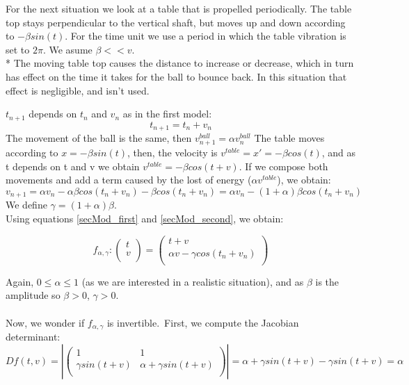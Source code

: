 \documentclass[a4paper]{article}
\begin{document}
For the next situation we look at a table that is propelled periodically.
The table top stays perpendicular to the vertical shaft,
but moves up and down according to $-\beta sin(t)$.
For the time unit we use a period in which the table vibration is set to $2\pi$.
We asume $\beta << v$.
\\*
The moving table top causes the distance to increase or decrease,
which in turn has effect on the time it takes for the ball to bounce back.
In this situation that effect is negligible, and isn't used.


$t_{n+1}$ depends on $t_n$ and $v_n$ as in the first model: 
\begin{equation}\label{secMod_first}
t_{n+1}=t_n + v_n
\end{equation}
The movement of the ball is the same, then $v_{n+1}^{ball}=\alpha v_n^{ball}$
The table moves according to $x=-\beta sin(t)$, then, the velocity is $v^{table}=x'=-\beta cos(t)$, and as t depends on t and v we obtain $v^{table}=-\beta cos(t+v)$. If we compose both movements and add a term caused by the lost of energy ($\alpha v^{table}$), we obtain:
\begin{equation}\label{secMod_second}
v_{n+1}=\alpha v_n -\alpha \beta cos(t_n+v_n) -\beta cos(t_n+v_n)=\alpha v_n-(1+\alpha)\beta cos(t_n+v_n)
\end{equation}
We define $\gamma=(1+\alpha)\beta$.\\
Using equations \ref{secMod_first} and \ref{secMod_second}, we obtain:

\begin{equation}
f_{\alpha,\gamma}:\begin{pmatrix} 
t\\
v\\
\end{pmatrix}=\begin{pmatrix} 
t+v\\
\alpha v-\gamma cos(t_n+v_n)\\
\end{pmatrix}
\end{equation}

Again, $0\leq \alpha \leq 1$ (as we are interested in a realistic situation), and as $\beta$ is the amplitude so $\beta>0$, $\gamma>0$.
\\
\\
Now, we wonder if $f_{\alpha,\gamma}$ is invertible.\
First, we compute the Jacobian determinant:
\begin{equation}
Df(t,v)=\left|\begin{pmatrix}
1 & 1\\
\gamma sin(t+v) & \alpha + \gamma sin(t+v) \\
\end{pmatrix}\right|=\alpha + \gamma sin(t+v) - \gamma sin(t+v) =\alpha
\end{equation}
\end{document}
